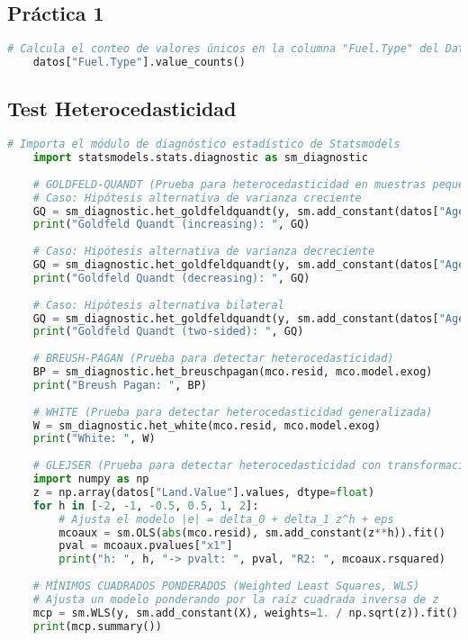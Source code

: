\documentclass[a4paper,12pt]{article}
\begin{document}
\subsection{Práctica 1}

\begin{lstlisting}[language=Python, style=custompython, caption={Conteo de frecuencias para la columna "Fuel.Type" del DataFrame.}]
    # Calcula el conteo de valores únicos en la columna "Fuel.Type" del DataFrame 'datos'
    datos["Fuel.Type"].value_counts()
\end{lstlisting}

\subsection{Test Heterocedasticidad}

\begin{lstlisting}[language=Python, style=custompython, caption={Pruebas de heterocedasticidad y ajuste de mínimos cuadrados ponderados.}]
    # Importa el módulo de diagnóstico estadístico de Statsmodels
    import statsmodels.stats.diagnostic as sm_diagnostic
    
    # GOLDFELD-QUANDT (Prueba para heterocedasticidad en muestras pequeñas)
    # Caso: Hipótesis alternativa de varianza creciente
    GQ = sm_diagnostic.het_goldfeldquandt(y, sm.add_constant(datos["Age"]), alternative="increasing")
    print("Goldfeld Quandt (increasing): ", GQ)
    
    # Caso: Hipótesis alternativa de varianza decreciente
    GQ = sm_diagnostic.het_goldfeldquandt(y, sm.add_constant(datos["Age"]), alternative="decreasing")
    print("Goldfeld Quandt (decreasing): ", GQ)
    
    # Caso: Hipótesis alternativa bilateral
    GQ = sm_diagnostic.het_goldfeldquandt(y, sm.add_constant(datos["Age"]), alternative="two-sided")
    print("Goldfeld Quandt (two-sided): ", GQ)
    
    # BREUSH-PAGAN (Prueba para detectar heterocedasticidad)
    BP = sm_diagnostic.het_breuschpagan(mco.resid, mco.model.exog)
    print("Breush Pagan: ", BP)
    
    # WHITE (Prueba para detectar heterocedasticidad generalizada)
    W = sm_diagnostic.het_white(mco.resid, mco.model.exog)
    print("White: ", W)
    
    # GLEJSER (Prueba para detectar heterocedasticidad con transformación de datos)
    import numpy as np
    z = np.array(datos["Land.Value"].values, dtype=float)
    for h in [-2, -1, -0.5, 0.5, 1, 2]:
        # Ajusta el modelo |e| = delta_0 + delta_1 z^h + eps
        mcoaux = sm.OLS(abs(mco.resid), sm.add_constant(z**h)).fit()
        pval = mcoaux.pvalues["x1"]
        print("h: ", h, "-> pvalt: ", pval, "R2: ", mcoaux.rsquared)
    
    # MÍNIMOS CUADRADOS PONDERADOS (Weighted Least Squares, WLS)
    # Ajusta un modelo ponderando por la raíz cuadrada inversa de z
    mcp = sm.WLS(y, sm.add_constant(X), weights=1. / np.sqrt(z)).fit()
    print(mcp.summary())
\end{lstlisting}
\end{document}
